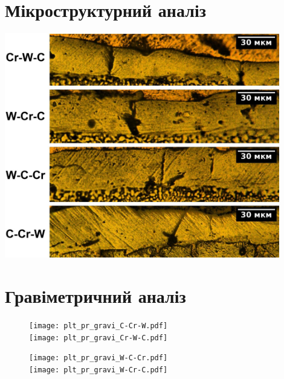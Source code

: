 \documentclass[12pt,aspectratio=43,hyperref={unicode}]{beamer}
\begin{document}
\section{Мікроструктурний аналіз}

\begin{frame}

\hspace{0.3cm}\includegraphics[width=0.9\textwidth]{figures/adapt_microstr}
\end{frame}

\section{Гравіметричний аналіз}

\begin{frame}
\begin{figure} %
  \begin{minipage}[c]{0.49\textwidth}
    \texttt{[image: plt\_pr\_gravi\_C-Cr-W.pdf]}\\
    \texttt{[image: plt\_pr\_gravi\_Cr-W-C.pdf]}
  \end{minipage}%
  \hfill
  \begin{minipage}[c]{0.49\textwidth}
    \texttt{[image: plt\_pr\_gravi\_W-C-Cr.pdf]}\\
    \texttt{[image: plt\_pr\_gravi\_W-Cr-C.pdf]}
  \end{minipage}
\end{figure}
\end{frame}
\end{document}
